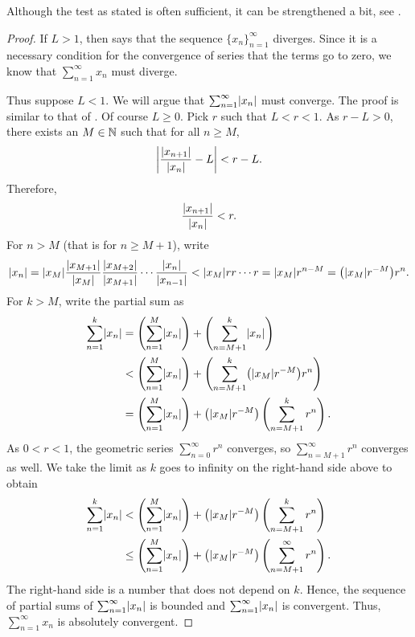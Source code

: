 Although the test as stated is often sufficient, it can be strengthened a
bit, see .

\begin{proof}
If $L > 1$, then
 says that the sequence $\{ x_n \}_{n=1}^\infty$
diverges.  Since it is a necessary condition for the convergence of series
that the terms go to zero, we know that $\sum_{n=1}^\infty x_n$ must diverge.

Thus suppose $L < 1$.
We will argue that $\sum_{n=1}^\infty \lvert {x_n} \rvert$ must converge.
The proof is similar to that of .  Of course $L \geq
0$.  
Pick
$r$ such that $L < r < 1$.  As $r-L > 0$, there exists an $M \in {\mathbb{N}}$ such that for
all $n \geq M$,
\begin{equation*}
\left\lvert {\frac{\lvert {x_{n+1}} \rvert}{\lvert {x_n} \rvert} - L} \right\rvert < r-L .
\end{equation*}
Therefore,
\begin{equation*}
\frac{\lvert {x_{n+1}} \rvert}{\lvert {x_n} \rvert} < r .
\end{equation*}
For $n > M$ (that is for $n \geq M+1$),
write
\begin{equation*}
\lvert {x_n} \rvert =
\lvert {x_M} \rvert
\frac{\lvert {x_{M+1}} \rvert}{\lvert {x_{M}} \rvert}
\frac{\lvert {x_{M+2}} \rvert}{\lvert {x_{M+1}} \rvert}
\cdots
\frac{\lvert {x_{n}} \rvert}{\lvert {x_{n-1}} \rvert}
<
\lvert {x_M} \rvert
r r \cdots r = \lvert {x_M} \rvert r^{n-M} =
\bigl(\lvert {x_M} \rvert r^{-M}\bigr) r^n .
\end{equation*}
For $k > M$, write the partial sum as
\begin{equation*}
\begin{split}
\sum_{n=1}^k \lvert {x_n} \rvert
& =
\left(\sum_{n=1}^{M} \lvert {x_n} \rvert \right)
+
\left(\sum_{n=M+1}^{k} \lvert {x_n} \rvert \right)
\\
& <
\left(\sum_{n=1}^{M} \lvert {x_n} \rvert \right)
+
\left(\sum_{n=M+1}^{k} 
\bigl(\lvert {x_M} \rvert r^{-M}\bigr) r^n
\right)
\\
& =
\left(\sum_{n=1}^{M} \lvert {x_n} \rvert \right)
+
\bigl(\lvert {x_M} \rvert r^{-M}\bigr)
\left( \sum_{n=M+1}^{k} r^n \right) .
\end{split}
\end{equation*}
As $0 < r < 1$, the geometric series
$\sum_{n=0}^{\infty} r^n$ converges, so
$\sum_{n=M+1}^{\infty} r^n$ converges as well.  We take the
limit as $k$ goes to infinity on the right-hand side above to obtain
\begin{equation*}
\begin{split}
\sum_{n=1}^k \lvert {x_n} \rvert
& <
\left(\sum_{n=1}^{M} \lvert {x_n} \rvert \right)
+
\bigl(\lvert {x_M} \rvert r^{-M}\bigr)
\left( \sum_{n=M+1}^{k} r^n \right) 
\\
& \leq
\left(\sum_{n=1}^{M} \lvert {x_n} \rvert \right)
+
\bigl(\lvert {x_M} \rvert r^{-M}\bigr)
\left( \sum_{n=M+1}^{\infty} r^n \right) .
\end{split}
\end{equation*}
The right-hand side is a number that does not depend on $k$.
Hence, the sequence of partial sums of $\sum_{n=1}^\infty \lvert {x_n} \rvert$ is bounded
and $\sum_{n=1}^\infty \lvert {x_n} \rvert$ is convergent.  Thus, $\sum_{n=1}^\infty x_n$ is
absolutely convergent.
\end{proof}

